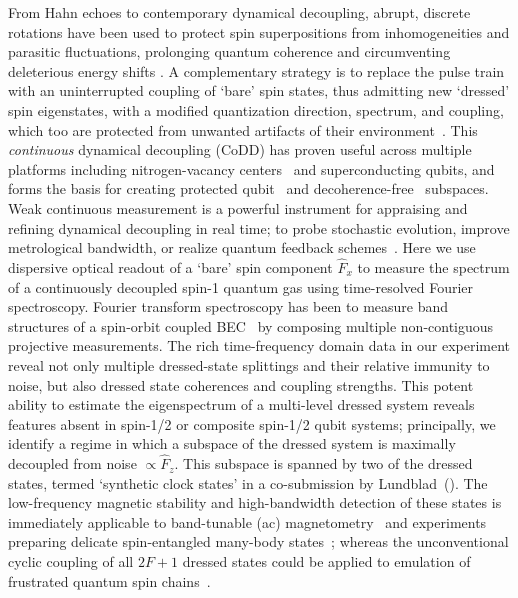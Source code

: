 \documentclass[aps,prl,reprint,superscriptaddress,floatfix]{revtex4-1}
\begin{document}
From Hahn echoes to contemporary dynamical decoupling, abrupt, discrete rotations have been used to protect spin superpositions from inhomogeneities and parasitic fluctuations, prolonging quantum coherence and circumventing deleterious energy shifts \cite{biercuk_optimized_2009,lange_universal_2010,bluhm_dephasing_2011}.
A complementary strategy is to replace the pulse train with an uninterrupted coupling of `bare' spin states, thus admitting new `dressed' spin eigenstates, with a modified quantization direction, spectrum, and coupling, which too are protected from unwanted artifacts of their environment~\cite{fanchini_continuously_2007}.
This \textit{continuous} dynamical decoupling (CoDD) has proven useful across multiple platforms including nitrogen-vacancy centers~\cite{hirose_continuous_2012,loretz_radio-frequency_2013,cai_robust_2012,*cai_long-lived_2012,golter_protecting_2014} and superconducting qubits, and forms the basis for creating protected qubit~\cite{aharon_general_2013} and decoherence-free~\cite{facchi_quantum_2002,*facchi_unification_2004} subspaces.
Weak continuous measurement is a powerful instrument for appraising and refining dynamical decoupling in real time; to probe stochastic evolution, improve metrological bandwidth, or realize quantum feedback schemes~\cite{vijay_stabilizing_2012}.
Here we use dispersive optical readout of a `bare' spin component $\hat{F}_x$ to measure the spectrum of a continuously decoupled spin-1 quantum gas using time-resolved Fourier spectroscopy. 
Fourier transform spectroscopy has been to measure band structures of a spin-orbit coupled BEC~\cite{valdes-curiel_fourier_2017} by composing multiple non-contiguous projective measurements.
The rich time-frequency domain data in our experiment reveal not only multiple dressed-state splittings and their relative immunity to noise, but also dressed state coherences and coupling strengths.
This potent ability to estimate the eigenspectrum of a multi-level dressed system reveals features absent in spin-1/2 or composite spin-1/2 qubit systems; principally, we identify a regime in which a subspace of the dressed system is maximally decoupled from noise $\propto \hat{F}_z$.
This subspace is spanned by two of the dressed states, termed `synthetic clock states' in a co-submission by Lundblad~\etal (\lundblad).
The low-frequency magnetic stability and high-bandwidth detection of these states is immediately applicable to band-tunable (ac) magnetometry~\cite{hirose_continuous_2012,loretz_radio-frequency_2013,ockeloen_quantum_2013,*horsley_frequency-tunable_2016} and experiments preparing delicate spin-entangled many-body states~\cite{stamper-kurn_spinor_2013}; whereas the unconventional cyclic coupling of all $2F+1$ dressed states could be applied to emulation of frustrated quantum spin chains~\cite{mikeska_one-dimensional_2004}.
\end{document}
